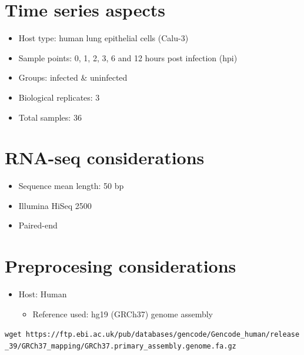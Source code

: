 \documentclass[
]{book}
\providecommand{\tightlist}{%
  \setlength{\itemsep}{0pt}\setlength{\parskip}{0pt}}
\begin{document}
\hypertarget{time-series-aspects}{%
\section{Time series aspects}\label{time-series-aspects}}

\begin{itemize}
\tightlist
\item
  Host type: human lung epithelial cells (Calu-3)\\
\item
  Sample points: 0, 1, 2, 3, 6 and 12 hours post infection (hpi)\\
\item
  Groups: infected \& uninfected\\
\item
  Biological replicates: 3\\
\item
  Total samples: 36
\end{itemize}

\hypertarget{rna-seq-considerations}{%
\section{RNA-seq considerations}\label{rna-seq-considerations}}

\begin{itemize}
\tightlist
\item
  Sequence mean length: 50 bp\\
\item
  Illumina HiSeq 2500\\
\item
  Paired-end
\end{itemize}

\hypertarget{preprocesing-considerations}{%
\section{Preprocesing considerations}\label{preprocesing-considerations}}

\begin{itemize}
\item
  Host: Human

  \begin{itemize}
  \tightlist
  \item
    Reference used: hg19 (GRCh37) genome assembly
  \end{itemize}
\end{itemize}

\texttt{wget\ https://ftp.ebi.ac.uk/pub/databases/gencode/Gencode\_human/release\_39/GRCh37\_mapping/GRCh37.primary\_assembly.genome.fa.gz}
\end{document}
